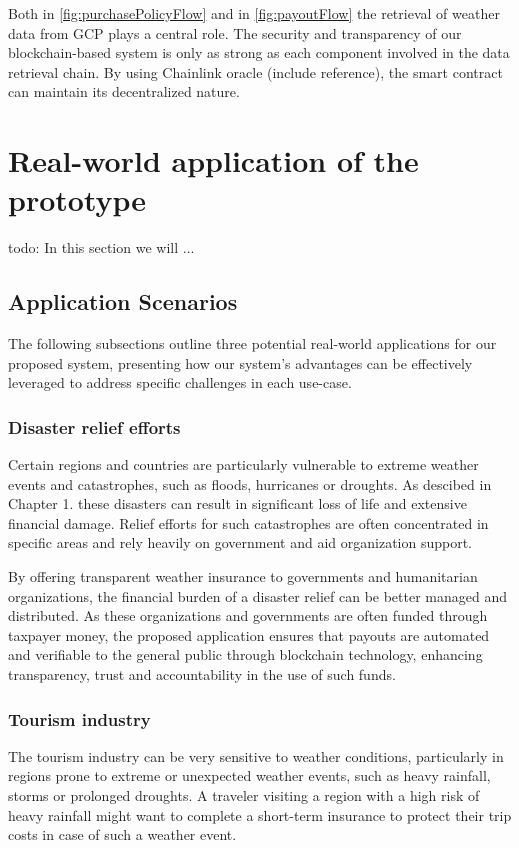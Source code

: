 Both in \cref{fig:purchasePolicyFlow} and in \cref{fig:payoutFlow} the retrieval of weather data from GCP plays a central role. The security and transparency of our blockchain-based system is only as strong as each component involved in the data retrieval chain. By using Chainlink oracle (include reference), the smart contract can maintain its decentralized nature. 


\section{Real-world application of the prototype}\label{section:real_world_application_prototype}

todo: In this section we will ...

\subsection{Application Scenarios}

The following subsections outline three potential real-world applications for our proposed system, presenting how our system's advantages can be effectively leveraged to address specific challenges in each use-case.

\subsubsection{Disaster relief efforts}\label{disaster_relief}
Certain regions and countries are particularly vulnerable to extreme weather events and catastrophes, such as floods, hurricanes or droughts. As descibed in Chapter 1. these disasters can result in significant loss of life and extensive financial damage. Relief efforts for such catastrophes are often concentrated in specific areas and rely heavily on government and aid organization support.

By offering transparent weather insurance to governments and humanitarian organizations, the financial burden of a disaster relief can be better managed and distributed. As these organizations and governments are often funded through taxpayer money, the proposed application ensures that payouts are automated and verifiable to the general public through blockchain technology, enhancing transparency, trust and accountability in the use of such funds.

\subsubsection{Tourism industry}\label{tourism_industry}
The tourism industry can be very sensitive to weather conditions, particularly in regions prone to extreme or unexpected weather events, such as heavy rainfall, storms or prolonged droughts. A traveler visiting a region with a high risk of heavy rainfall might want to complete a short-term insurance to protect their trip costs in case of such a weather event.

